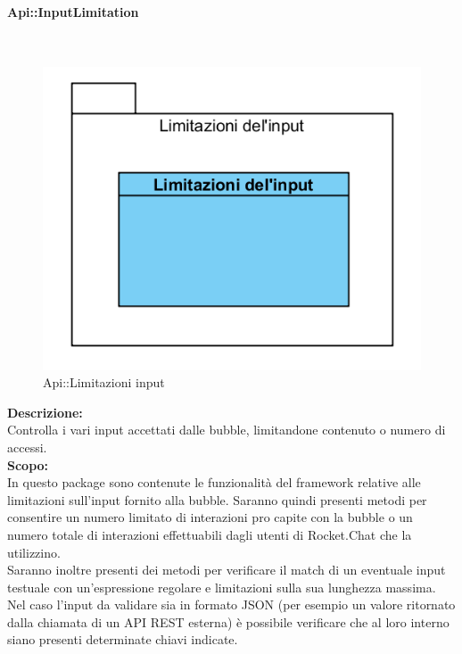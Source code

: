 \begin{samepage}
\paragraph{Api\-::Input\-Limitation}\label{api-limiti}\mbox{}\\
\begin{figure}[H]
	\centering
	\includegraphics[width=14cm]{diagrammi_img/classi_e_package/api_limitinput.png}
	\caption{Api\-::Limitazioni input}
\end{figure}
\end{samepage}
\textbf{Descrizione:}\\
Controlla i vari input accettati dalle bubble, limitandone contenuto o numero di accessi.\\
\textbf{Scopo:}\\
In questo package sono contenute le funzionalità del framework relative alle limitazioni sull'input fornito alla bubble. Saranno quindi presenti metodi per consentire un numero limitato di interazioni pro capite con la bubble o un numero totale di interazioni effettuabili dagli utenti di Rocket.Chat che la utilizzino.\\
Saranno inoltre presenti dei metodi per verificare il match di un eventuale input testuale con un'espressione regolare e limitazioni sulla sua lunghezza massima. Nel caso l'input da validare sia in formato JSON (per esempio un valore ritornato dalla chiamata di un API REST esterna) è possibile verificare che al loro interno siano presenti determinate chiavi indicate.

